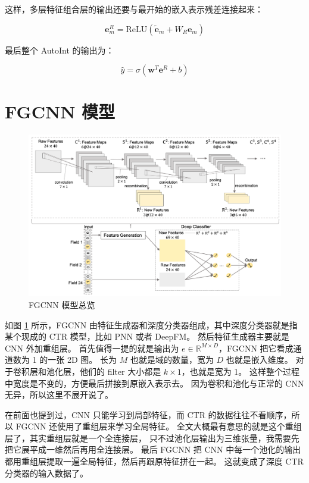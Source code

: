 \documentclass[degree=project,degree-type=project,cjk-font=noto]{thuthesis}
\begin{document}
这样，多层特征组合层的输出还要与最开始的嵌入表示残差连接起来：

\begin{equation}
  \bm{e}^{R}_m = \text{ReLU}(\tilde{\bm{e}}_m + W_R \bm{e}_m)
\end{equation}

最后整个 AutoInt 的输出为：

\begin{equation}
  \hat{y} = \sigma(\bm{w}^T \bm{e}^R + b)
\end{equation}

\section{FGCNN 模型}

\begin{figure}[h]
\centering%
\includegraphics[width=.95\linewidth]{FGCNN}
  \caption{FGCNN 模型总览}
  \label{fig:fgcnn}
\end{figure}

如图 \ref{fig:fgcnn} 所示，FGCNN 由特征生成器和深度分类器组成，其中深度分类器就是指某个现成的 CTR 模型，比如 PNN 或者 DeepFM。
然后特征生成器主要就是 CNN 外加重组层。
首先值得一提的就是输出为 $e \in \mathbb{R}^{M \times D}$，FGCNN 把它看成通道数为 1 的一张 2D 图。
长为 $M$ 也就是域的数量，宽为 $D$ 也就是嵌入维度。
对于卷积层和池化层，他们的 filter 大小都是 $k \times 1$，也就是宽为 1。
这样整个过程中宽度是不变的，方便最后拼接到原嵌入表示去。
因为卷积和池化与正常的 CNN 无异，所以这里不展开说了。

在前面也提到过，CNN 只能学习到局部特征，而 CTR 的数据往往不看顺序，所以 FGCNN 还使用了重组层来学习全局特征。
全文大概最有意思的就是这个重组层了，其实重组层就是一个全连接层，
只不过池化层输出为三维张量，我需要先把它展平成一维然后再用全连接层。
最后 FGCNN 把 CNN 中每一个池化的输出都用重组层提取一遍全局特征，然后再跟原特征拼在一起。
这就变成了深度 CTR 分类器的输入数据了。
\end{document}
